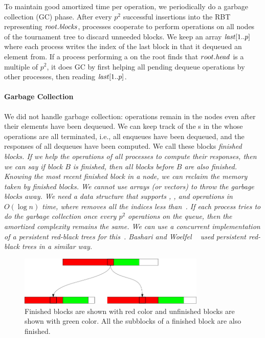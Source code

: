 To maintain good amortized time per operation, we periodically do a garbage collection (GC) phase.
After every $p^2$ successful insertions into the RBT representing $\mbox{\textnormal{\textit{root}}}.\mbox{\textit{blocks}}$,
processes cooperate to perform  operations on all nodes of the tournament tree  
to discard unneeded blocks.
We keep an array $\mbox{\textnormal{\textit{last}}}[1..p]$ where each process writes the index of the last block in
 that it dequeued an element from.
If a process performing a  on the root finds that $root.\mbox{\textit{head}}$ is a multiple
of $p^2$, it does GC by first helping all pending dequeue operations by other processes,
then reading $\mbox{\textnormal{\textit{last}}}[1..p]$.


\paragraph{Garbage Collection}
We did not handle garbage collection:  operations  remain in the nodes even after their elements have been dequeued.
We can keep track of the s in the  whose operations are all terminated, i.e., all enqueues have been dequeued, and the responses of all dequeues have been computed. We call these blocks \it{finished blocks}. If we help the operations of all processes to compute their responses, then we can say if block $B$ is finished, then all blocks before $B$ are also finished. Knowing the most recent finished block in a node, we can reclaim the memory taken by finished blocks. We cannot use arrays (or vectors) to throw the garbage blocks away. We need a data structure that supports , ,  and  operations in $O(\log n)$ time, where  removes all the indices less than~. If each process tries to do the garbage collection once every $p^2$ operations on the queue, then the amortized complexity remains the same. We can use a concurrent implementation of a persistent red-black trees for this~\cite{DBLP:conf/afp/Okasaki96}. Bashari and Woelfel ~\cite{DBLP:conf/podc/BashariW21} used persistent red-black trees in a similar way.


\begin{figure}[hbt]  
  \center\includegraphics[width=3.5in]{pics/finishedBlocks.png}
  \caption[Blocks that can be safely garbage collected.]{Finished blocks are shown with red color and unfinished blocks are shown with green color. All the subblocks of a finished block are also finished.}
  \label{fig::finishedBlock}
\end{figure}
